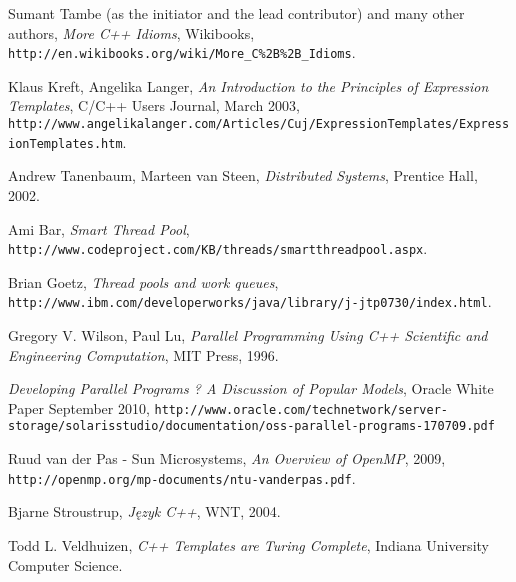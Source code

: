 \begin{thebibliography}{99}
 Sumant Tambe (as the initiator and the lead contributor) and many other authors, \textit{More C++ Idioms}, Wikibooks, \texttt{http://en.wikibooks.org/wiki/More\_C\%2B\%2B\_Idioms}.

 Klaus Kreft, Angelika Langer, \textit{An Introduction to the Principles of Expression Templates}, C/C++ Users Journal, March 2003, \texttt{http://www.angelikalanger.com/Articles/Cuj/ExpressionTemplates/ExpressionTemplates.htm}.

 Andrew Tanenbaum, Marteen van Steen, \textit{Distributed Systems}, Prentice Hall, 2002.

 Ami Bar, \textit{Smart Thread Pool}, \texttt{http://www.codeproject.com/KB/threads/smartthreadpool.aspx}.

 Brian Goetz, \textit{Thread pools and work queues}, \texttt{http://www.ibm.com/developerworks/java/library/j-jtp0730/index.html}.

 Gregory V. Wilson, Paul Lu, \textit{Parallel Programming Using C++ Scientific and Engineering Computation}, MIT Press, 1996.

 \textit{Developing Parallel Programs ? A Discussion of Popular Models}, Oracle White Paper September 2010, \texttt{http://www.oracle.com/technetwork/server-storage/solarisstudio/documentation/oss-parallel-programs-170709.pdf}

 Ruud van der Pas - Sun Microsystems, \textit{An Overview of OpenMP}, 2009, \texttt{http://openmp.org/mp-documents/ntu-vanderpas.pdf}.

 Bjarne Stroustrup, \textit{Język C++}, WNT, 2004.

 Todd L. Veldhuizen, \textit{C++ Templates are Turing Complete}, Indiana University Computer Science.



\end{thebibliography}